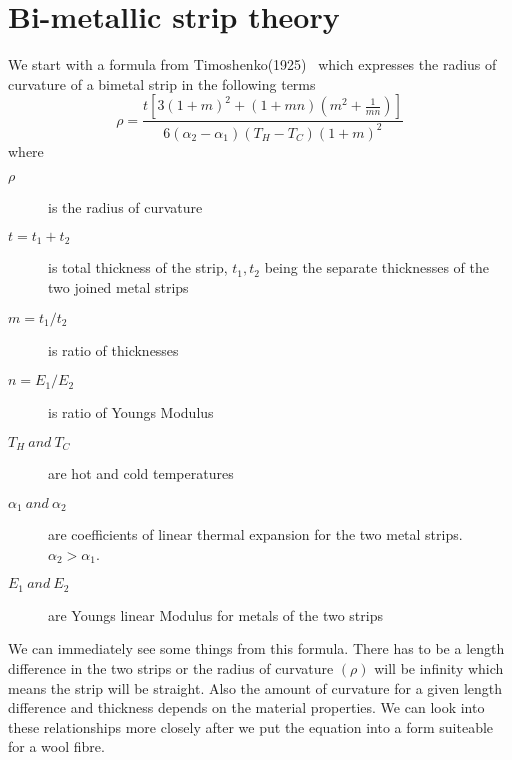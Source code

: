 \documentclass[titlepage]{article}  %
\begin{document}
\section{Bi-metallic strip theory}
We start with a formula from Timoshenko(1925)~\cite{timo:25} which expresses the radius of curvature of a bimetal strip in the following terms
\begin{equation}
\label{eqn:timo}
\rho = \frac{t \left[ 3(1+m)^{2}+(1+mn)(m^{2}+\frac{1}{mn})\right]} {6(\alpha_{2}- \alpha_{1})(T_{H} - T_{C})(1+m)^{2}}
\end{equation}
where
\begin{description}
\item[$\rho$] is the radius of curvature
\item[$t = t_{1} + t_{2}$] is total thickness of the strip, $t_{1},t_{2}$ being the separate thicknesses of the two joined metal strips
\item[$m = t_{1}/t_{2}$] is ratio of thicknesses
\item[$n = E_{1}/E_{2}$] is ratio of Youngs Modulus
\item[$T_{H}\: and\: T_{C}$] are hot and cold temperatures
\item[$\alpha_{1}\: and\: \alpha_{2}$] are coefficients of linear thermal expansion for the two metal strips. $\alpha_{2} > \alpha_{1}$.
\item[$E_{1}\: and\: E_{2}$]are Youngs linear Modulus for metals of the two strips
\end{description}

We can immediately see some things from this formula. There has to be a length difference in the two strips or the radius of curvature $(\rho)$ will be infinity which means the strip will be straight. Also the amount of curvature for a given length difference and thickness depends on the material properties. We can look into these relationships more closely after we put the equation into a form suiteable for a wool fibre.
\end{document}
